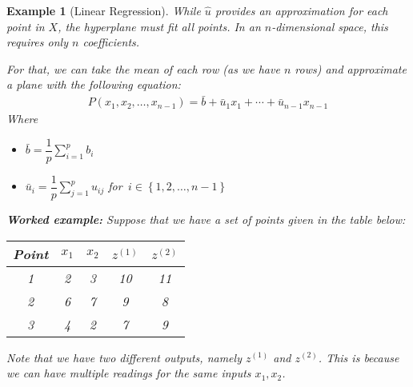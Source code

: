 \documentclass{book}
\newtheorem{example}{Example}[chapter]
\begin{document}
\begin{example}[Linear Regression]
    While $\hat u$ provides an approximation for each point in $X$, the hyperplane
    must fit all points. In an $n$-dimensional space, this requires only $n$
    coefficients.

    For that, we can take the mean of each row (as we have $n$ rows) and
    approximate a plane with the following equation:
    \begin{equation}
        \begin{split}
            P(x_1, x_2, \dots, x_{n-1}) = \bar{b} + \bar{u}_1 x_1 + \cdots + \bar{u}_{n-1} x_{n-1}        \end{split}
    \end{equation} Where
    \begin{itemize}
        \item $\bar{b} = \dfrac{1}{p}\sum_{i=1}^{p}{b_i}$
        \item $\bar{u}_i = \dfrac{1}{p}\sum_{j=1}^{p}{u_{i j}}$ for $\,i\in\left\{1,2,\dots,n-1\right\}$
    \end{itemize}

    \textbf{Worked example: } Suppose that we have a set of points given in the table below:

    \begin{center}
        \begin{tabular}{|c|c|c|c|c|}
            \hline
            \textbf{Point} & $x_1$ & $x_2$ & $z^{(1)}$ & $z^{(2)}$ \\
            \hline
            1              & 2     & 3     & 10        & 11        \\
            2              & 6     & 7     & 9         & 8         \\
            3              & 4     & 2     & 7         & 9         \\
            \hline
        \end{tabular}
    \end{center}

    Note that we have two different outputs, namely $z^{(1)}$ and $z^{(2)}$. This
    is because we can have multiple readings for the same inputs $x_1,x_2$.


\end{example}
\end{document}
